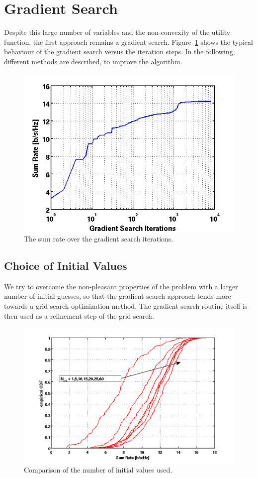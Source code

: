 \section{Gradient Search}
\label{sec:grads_solver}

Despite this large number of variables and the non-convexity of the utility function, the first approach remains a gradient search.
Figure~\ref{fig:grad_search} shows the typical behaviour of the gradient search versus the iteration steps.
In the following, different methods are described, to improve the algorithm.

\begin{figure}[h]
\centering
  \includegraphics[width=0.5\linewidth]{images/rvsgradCnt_7rel_18dB_6.png}
\caption{The sum rate over the gradient search iterations.}
\label{fig:grad_search}
\end{figure}

\subsection{Choice of Initial Values}
\label{sec:grads_ini}
We try to overcome the non-pleasant properties of the problem with a larger number of initial guesses, so that the gradient search approach tends more towards a grid search optimization method.
The gradient search routine itself is then used as a refinement step of the grid search.
\begin{figure}[h]
\centering
  \includegraphics[width=0.9\linewidth]{images/Inicomparison_edited.png}
\caption{Comparison of the number of initial values used.}
\label{fig:ini_comp}
\end{figure}


